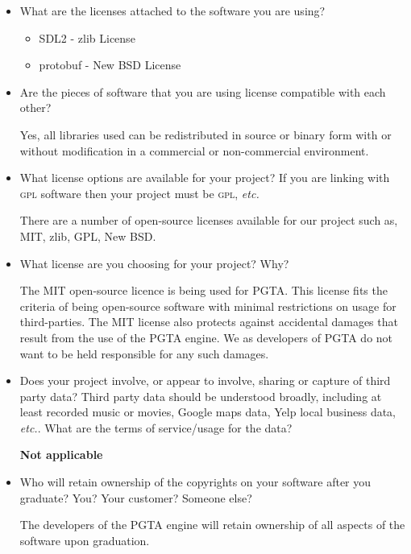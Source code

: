 \documentclass{tufte-handout}
\newcommand{\etc}{\emph{etc.}\xspace}
\begin{document}
\begin{itemize}

    \item What are the licenses attached to the software you are using?
    \begin{itemize}
        \item SDL2 - zlib License\cite{SDL}
        \item protobuf - New BSD License\cite{protobuf}
    \end{itemize}

    \item Are the pieces of software that you are using license
    compatible with each other? 

    Yes, all libraries used can be redistributed in source or binary form with or without modification in a
    commercial or non-commercial environment.\cite{zlib}\cite{BSD}

    \item What license options are available for your project? If you
    are linking with \textsc{gpl} software then your project must be
    \textsc{gpl}, \etc

    There are a number of open-source licenses available for our project such as, MIT, zlib, GPL, New BSD.

    \item What license are you choosing for your project? Why?

    The MIT open-source licence is being used for PGTA. This license fits the criteria of being open-source 
    software with minimal restrictions on usage for third-parties. The MIT license also protects against
    accidental damages that result from the use of the PGTA engine.\cite{MIT} We as developers of PGTA do not want
    to be held responsible for any such damages. 

    \item Does your project involve, or appear to involve, 
    sharing or capture of third party data?  Third party data should
    be understood broadly, including at least recorded music or
    movies, Google maps data, Yelp local business data, \etc.  
    What are the terms of service/usage for the data?

    \textbf{Not applicable}

    \item Who will retain ownership of the copyrights on your software
    after you graduate? You? Your customer? Someone else?

    The developers of the PGTA engine will retain ownership of all aspects of the software upon graduation.

\end{itemize}
\end{document}
